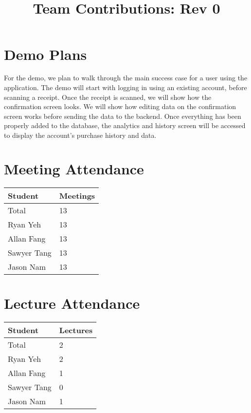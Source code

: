\documentclass{article}
\title{Team Contributions: Rev 0\\\progname}
\author{\authname}
\date{}
\begin{document}
\maketitle

\section{Demo Plans}

For the demo, we plan to walk through the main success case for a user using the application.
The demo will start with logging in using an existing account, before scanning a receipt. Once
the receipt is scanned, we will show how the confirmation screen looks. We will show how editing
data on the confirmation screen works before sending the data to the backend. Once everything has
been properly added to the database, the analytics and history screen will be accessed to display the account's
purchase history and data.

\section{Meeting Attendance}

\begin{table}[H]
\centering
\begin{tabular}{ll}
\toprule
\textbf{Student} & \textbf{Meetings}\\
\midrule
Total & 13\\
Ryan Yeh & 13\\
Allan Fang & 13\\
Sawyer Tang & 13\\
Jason Nam & 13\\
\bottomrule
\end{tabular}
\end{table}

\section{Lecture Attendance}

\begin{table}[H]
\centering
\begin{tabular}{ll}
\toprule
\textbf{Student} & \textbf{Lectures}\\
\midrule
Total & 2\\
Ryan Yeh & 2\\
Allan Fang & 1\\
Sawyer Tang & 0\\
Jason Nam & 1\\
\bottomrule
\end{tabular}
\end{table}
\end{document}
